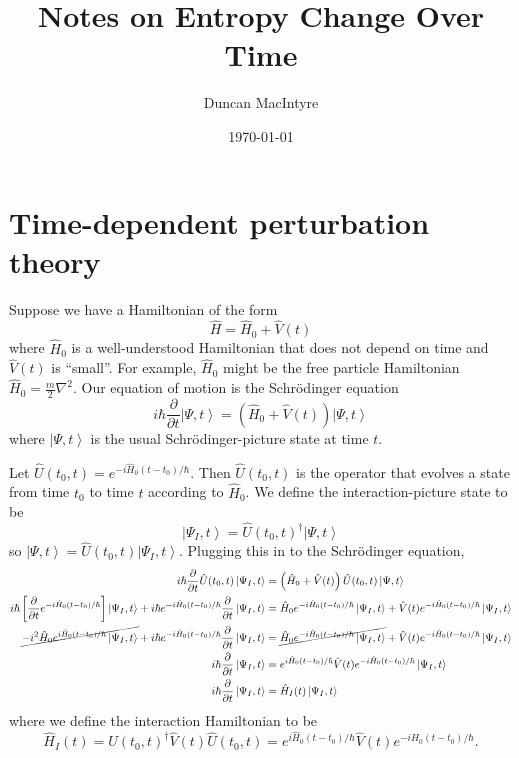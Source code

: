 \documentclass[11pt]{article}
\newcommand{\ket}[1]{\left|#1\right\rangle}
\newcommand{\op}[1]{\hat{#1}}
\theoremstyle{theorem}
\theoremstyle{remark}
\theoremstyle{step}
\theoremstyle{gap}
\begin{document}
\title{Notes on Entropy Change Over Time}
\author{Duncan MacIntyre}
\date{\today}
\maketitle
\tableofcontents
\bigskip
\newpage

\section{Time-dependent perturbation theory}

Suppose we have a Hamiltonian of the form \[\op{H} = \op{H}_0 + \op{V}(t)\]
where \(\op{H}_0\) is a well-understood Hamiltonian that does not depend on time and \(\op{V}(t)\) is ``small''. For example, \(\op{H}_0\) might be the free particle Hamiltonian \(\op{H}_0 = \frac{m}{2} \nabla^2\). Our equation of motion is the Schr\"odinger equation
\[i \hbar \frac{\partial}{\partial t} \ket{\Psi, t} = \left(\op{H}_0 + \op{V}(t)\right) \ket{\Psi, t}\]
where \(\ket{\Psi, t}\) is the usual Schr\"odinger-picture state at time \(t\).

Let \(\op{U}(t_0, t) = e^{-i\op{H}_0(t-t_0)/\hbar}\). Then \(\op{U}(t_0, t)\) is the operator that evolves a state from time \(t_0\) to time \(t\) according to \(\op{H}_0\). We define the interaction-picture state to be
\[\ket{\Psi_I, t} = \op{U}(t_0, t)^\dagger \ket{\Psi, t}\]
so \(\ket{\Psi, t} = \op{U}(t_0, t) \ket{\Psi_I, t}\).
Plugging this in to the Schr\"odinger equation,
\begin{align*}
i \hbar \frac{\partial}{\partial t} \op{U}(t_0, t)\ket{\Psi_I, t} &= \left(\op{H}_0 + \op{V}(t)\right) \op{U}(t_0, t)\ket{\Psi, t} \\
i \hbar \left[\frac{\partial}{\partial t} e^{-i\op{H}_0(t-t_0)/\hbar}\right] \ket{\Psi_I, t} + i \hbar e^{-i\op{H}_0(t-t_0)/\hbar} \frac{\partial}{\partial t} \ket{\Psi_I, t} &= \op{H}_0 e^{-i\op{H}_0(t-t_0)/\hbar}\ket{\Psi_I, t} + \op{V}(t) e^{-i\op{H}_0(t-t_0)/\hbar}\ket{\Psi_I, t} \\
\cancel{-i^2 \op{H}_0 e^{i\op{H}_0(t-t_0)/\hbar} \ket{\Psi_I, t}} + i \hbar e^{-i\op{H}_0(t-t_0)/\hbar} \frac{\partial}{\partial t} \ket{\Psi_I, t} &= \cancel{\op{H}_0 e^{-i\op{H}_0(t-t_0)/\hbar}\ket{\Psi_I, t}} + \op{V}(t) e^{-i\op{H}_0(t-t_0)/\hbar}\ket{\Psi_I, t} \\
 i \hbar \frac{\partial}{\partial t} \ket{\Psi_I, t} &= e^{i\op{H}_0(t-t_0)/\hbar}\op{V}(t) e^{-i\op{H}_0(t-t_0)/\hbar}\ket{\Psi_I, t} \\
 i \hbar \frac{\partial}{\partial t} \ket{\Psi_I, t} &= \op{H}_I(t)\ket{\Psi_I, t}
\end{align*}
where we define the interaction Hamiltonian to be
\[\op{H}_I(t) = \op{U}(t_0, t)^\dagger \op{V}(t)\op{U}(t_0, t) = e^{i\op{H}_0(t-t_0)/\hbar}\op{V}(t) e^{-i\op{H}_0(t-t_0)/\hbar}.\]
\end{document}
